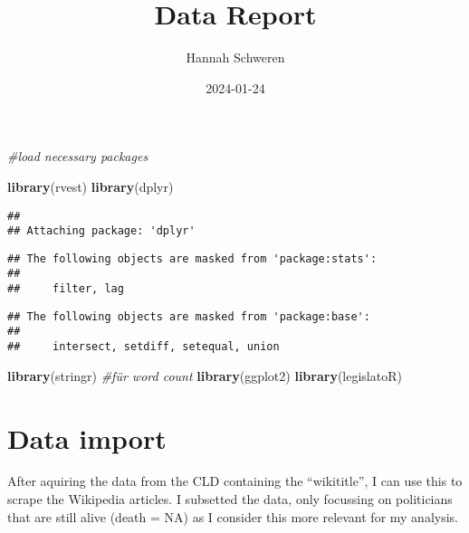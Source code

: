 \documentclass[
]{article}
\title{Data Report}
\author{Hannah Schweren}
\date{2024-01-24}
\newenvironment{Shaded}{\begin{snugshade}}{\end{snugshade}}
\newcommand{\CommentTok}[1]{\textcolor[rgb]{0.56,0.35,0.01}{\textit{#1}}}
\newcommand{\FunctionTok}[1]{\textcolor[rgb]{0.13,0.29,0.53}{\textbf{#1}}}
\newcommand{\NormalTok}[1]{#1}
\begin{document}
\maketitle

\begin{Shaded}
\begin{Highlighting}[]
\CommentTok{\#load necessary packages}

\FunctionTok{library}\NormalTok{(rvest)}
\FunctionTok{library}\NormalTok{(dplyr)}
\end{Highlighting}
\end{Shaded}

\begin{verbatim}
## 
## Attaching package: 'dplyr'
\end{verbatim}

\begin{verbatim}
## The following objects are masked from 'package:stats':
## 
##     filter, lag
\end{verbatim}

\begin{verbatim}
## The following objects are masked from 'package:base':
## 
##     intersect, setdiff, setequal, union
\end{verbatim}

\begin{Shaded}
\begin{Highlighting}[]
\FunctionTok{library}\NormalTok{(stringr) }\CommentTok{\#für word count}
\FunctionTok{library}\NormalTok{(ggplot2)}
\FunctionTok{library}\NormalTok{(legislatoR)}
\end{Highlighting}
\end{Shaded}

\hypertarget{data-import}{%
\section{Data import}\label{data-import}}

After aquiring the data from the CLD containing the ``wikititle'', I can
use this to scrape the Wikipedia articles. I subsetted the data, only
focussing on politicians that are still alive (death = NA) as I consider
this more relevant for my analysis.
\end{document}
